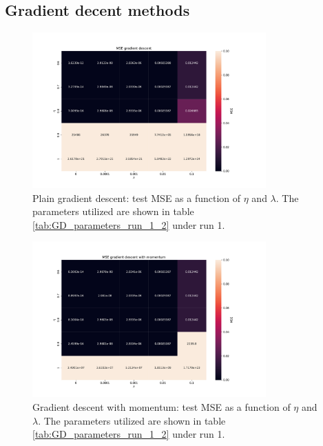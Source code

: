 \subsection{Gradient decent methods}


\begin{figure}[H]
\centering
\includegraphics[width=0.8\textwidth]{Figures/PartA/gd_MSE(eta,lmb)}
\caption{Plain gradient descent: test MSE as a function of \(\eta \) and \(\lambda \). 
The parameters utilized are shown in table \ref{tab:GD_parameters_run_1_2} under run 1.}
\label{fig:gd_MSE-eta-lmb-}
\end{figure}

\begin{figure}[H]
\centering
\includegraphics[width=0.8\textwidth]{Figures/PartA/gdm_MSE(eta,lmb)}
\caption{Gradient descent with momentum: test MSE as a function of \(\eta \) and \(\lambda \).
 The parameters utilized are shown in table \ref{tab:GD_parameters_run_1_2} under run 1.}
\label{fig:gdm_MSE-eta-lmb-}
\end{figure}


